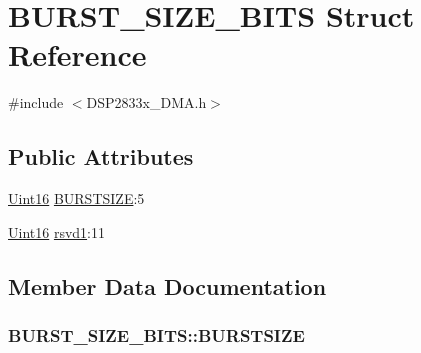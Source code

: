 \hypertarget{struct_b_u_r_s_t___s_i_z_e___b_i_t_s}{}\section{B\+U\+R\+S\+T\+\_\+\+S\+I\+Z\+E\+\_\+\+B\+I\+T\+S Struct Reference}
\label{struct_b_u_r_s_t___s_i_z_e___b_i_t_s}


{\ttfamily \#include $<$D\+S\+P2833x\+\_\+\+D\+M\+A.\+h$>$}

\subsection*{Public Attributes}
\begin{DoxyCompactItemize}
\item 
\hyperlink{_d_s_p2833x___device_8h_a59a9f6be4562c327cbfb4f7e8e18f08b}{Uint16} \hyperlink{struct_b_u_r_s_t___s_i_z_e___b_i_t_s_a6c45136e9e2cf47454aca2f86f69a290}{B\+U\+R\+S\+T\+S\+I\+Z\+E}\+:5
\item 
\hyperlink{_d_s_p2833x___device_8h_a59a9f6be4562c327cbfb4f7e8e18f08b}{Uint16} \hyperlink{struct_b_u_r_s_t___s_i_z_e___b_i_t_s_aa246f403843691d354eb6839f5e12dbc}{rsvd1}\+:11
\end{DoxyCompactItemize}


\subsection{Member Data Documentation}
\hypertarget{struct_b_u_r_s_t___s_i_z_e___b_i_t_s_a6c45136e9e2cf47454aca2f86f69a290}{}
\subsubsection[{B\+U\+R\+S\+T\+S\+I\+Z\+E}]{ B\+U\+R\+S\+T\+\_\+\+S\+I\+Z\+E\+\_\+\+B\+I\+T\+S\+::\+B\+U\+R\+S\+T\+S\+I\+Z\+E}\label{struct_b_u_r_s_t___s_i_z_e___b_i_t_s_a6c45136e9e2cf47454aca2f86f69a290}
\hypertarget{struct_b_u_r_s_t___s_i_z_e___b_i_t_s_aa246f403843691d354eb6839f5e12dbc}{}
